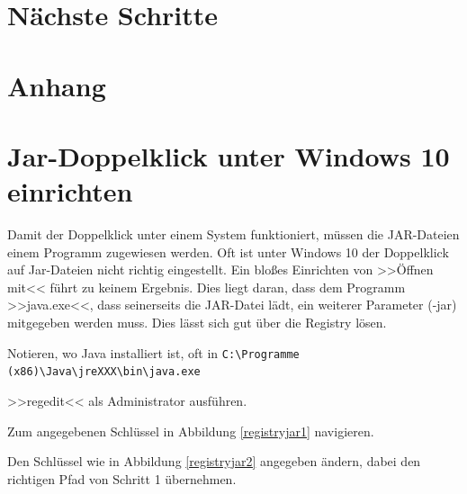 \documentclass[12pt]{scrartcl}
\begin{document}
\section{Nächste Schritte}

\section*{Anhang}
\appendix
\section{Jar-Doppelklick unter Windows 10 einrichten}
Damit der Doppelklick unter einem System funktioniert, müssen die JAR-Dateien einem Programm zugewiesen werden. Oft ist unter Windows 10 der Doppelklick auf Jar-Dateien nicht richtig eingestellt. Ein bloßes Einrichten von >>Öffnen mit<< führt zu keinem Ergebnis. Dies liegt daran, dass dem Programm >>java.exe<<, dass seinerseits die JAR-Datei lädt, ein weiterer Parameter (-jar) mitgegeben werden muss. Dies lässt sich gut über die Registry lösen.

\begin{compactenum}
\item Notieren, wo Java installiert ist, oft in \verb+C:\Programme (x86)\Java\jreXXX\bin\java.exe+
\item >>regedit<< als Administrator ausführen.
\item Zum angegebenen Schlüssel in Abbildung \ref{registryjar1} navigieren.
\item Den Schlüssel wie in Abbildung \ref{registryjar2} angegeben ändern, dabei den richtigen Pfad von Schritt 1 übernehmen.
\end{compactenum}

\end{document}
